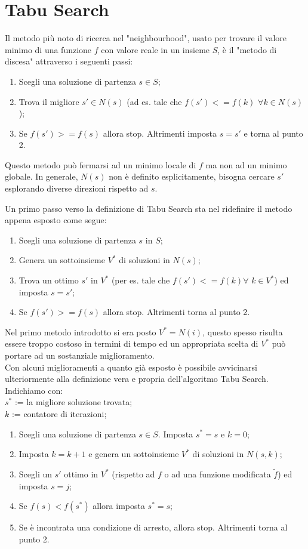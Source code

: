 \section{Tabu Search}
Il metodo più noto di ricerca nel "neighbourhood", usato per trovare il valore minimo di una funzione $f$ con valore reale in un insieme $S$, è il "metodo di discesa" attraverso i seguenti passi:
\begin{enumerate}
\item Scegli una soluzione di partenza $s \in S$;
\item Trova il migliore $s' \in N(s)$ (ad es. tale che $f(s')<=f(k)$ $\forall k \in N(s)$);
\item Se $f(s')>=f(s)$ allora stop. Altrimenti imposta $s=s'$ e torna al punto 2.
\end{enumerate}
Questo metodo può fermarsi ad un minimo locale di $f$ ma non ad un minimo globale. In generale, $N(s)$ non è definito esplicitamente, bisogna cercare $s'$ esplorando diverse direzioni rispetto ad $s$.

Un primo passo verso la definizione di Tabu Search sta nel ridefinire il metodo appena esposto come segue:
\begin{enumerate}
\item Scegli una soluzione di partenza $s$ in $S$;
\item Genera un sottoinsieme $V^*$ di soluzioni in $N(s)$;
\item Trova un ottimo $s'$ in $V^*$ (per es. tale che $f(s')<=f(k) \forall$ $k \in V^*$) ed imposta $s=s'$;
\item Se $f(s')>=f(s)$ allora stop. Altrimenti torna al punto 2.
\end{enumerate}
Nel primo metodo introdotto si era posto $V^* = N(i)$, questo spesso risulta essere troppo costoso in termini di tempo ed un appropriata scelta di $V^*$ può portare ad un sostanziale miglioramento.\\

Con alcuni miglioramenti a quanto già esposto è possibile avvicinarsi ulteriormente alla definizione vera e propria dell'algoritmo Tabu Search.\\
Indichiamo con:\\ 
$s^*$ := la migliore soluzione trovata;\\
$k$ := contatore di iterazioni;
\begin{enumerate}
\item Scegli una soluzione di partenza $s \in S$. Imposta $s^*=s$ e $k=0$;
\item Imposta $k = k+1$ e genera un sottoinsieme $V^*$ di soluzioni in $N(s,k)$;
\item Scegli un $s'$ ottimo in $V^*$ (rispetto ad $f$ o ad una funzione modificata $\widetilde{f}$) ed imposta $s=j$;
\item Se $f(s)<f(s^*)$ allora imposta $s^*=s$;
\item Se è incontrata una condizione di arresto, allora stop. Altrimenti torna al punto 2.
\end{enumerate}

